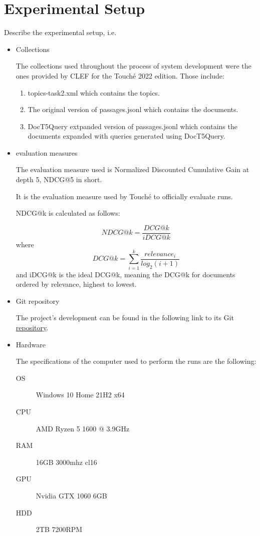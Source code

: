 \section{Experimental Setup}
\label{sec:setup}

Describe the experimental setup, i.e.
\begin{itemize}
	\item Collections

	The collections used throughout the process of system development were the ones provided by CLEF for the Touché 2022 edition. Those include:

	\begin{enumerate}
		\item topics-task2.xml which contains the topics.
		\item The original version of passages.jsonl which contains the documents.
		\item DocT5Query extpanded version of passages.jsonl which contains the documents expanded with queries generated using DocT5Query.
	\end{enumerate}
	\item evaluation measures

	The evaluation measure used is Normalized Discounted Cumulative Gain at depth 5, NDCG@5 in short.

	It is the evaluation measure used by Touché to officially evaluate runs.

	NDCG@k is calculated as follows:

	$$
	NDCG@k = \frac{DCG@k}{iDCG@k}
	$$
	where
	$$
	DCG@k = \sum_{i=1}^{k}\frac{relevance_i}{log_2(i+1)}
	$$
	and iDCG@k is the ideal DCG@k, meaning the DCG@k for documents ordered by relevance, highest to lowest.

	\item Git repository

	The project’s development can be found in the following link to its Git \href{https://bitbucket.org/upd-dei-stud-prj/seupd2122-kueri/src/master/}{repository}.
	\item Hardware

	The specifications of the computer used to perform the runs are the following:
	\begin{description}
		\item[OS] Windows 10 Home 21H2 x64
		\item[CPU] AMD Ryzen 5 1600 @ 3.9GHz
		\item[RAM] 16GB 3000mhz cl16
		\item[GPU] Nvidia GTX 1060 6GB
		\item[HDD] 2TB 7200RPM
	\end{description}
\end{itemize}